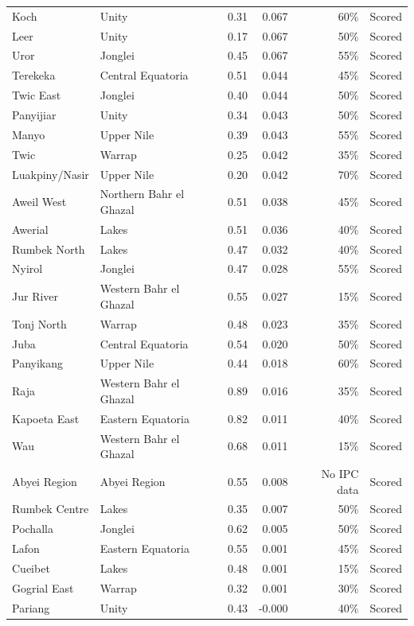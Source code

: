 \begin{longtable}{llrrrl}
Koch & Unity & 0.31 & 0.067 & 60\% & Scored \\
Leer & Unity & 0.17 & 0.067 & 50\% & Scored \\
Uror & Jonglei & 0.45 & 0.067 & 55\% & Scored \\
Terekeka & Central Equatoria & 0.51 & 0.044 & 45\% & Scored \\
Twic East & Jonglei & 0.40 & 0.044 & 50\% & Scored \\
Panyijiar & Unity & 0.34 & 0.043 & 50\% & Scored \\
Manyo & Upper Nile & 0.39 & 0.043 & 55\% & Scored \\
Twic & Warrap & 0.25 & 0.042 & 35\% & Scored \\
Luakpiny/Nasir & Upper Nile & 0.20 & 0.042 & 70\% & Scored \\
Aweil West & Northern Bahr el Ghazal & 0.51 & 0.038 & 45\% & Scored \\
Awerial & Lakes & 0.51 & 0.036 & 40\% & Scored \\
Rumbek North & Lakes & 0.47 & 0.032 & 40\% & Scored \\
Nyirol & Jonglei & 0.47 & 0.028 & 55\% & Scored \\
Jur River & Western Bahr el Ghazal & 0.55 & 0.027 & 15\% & Scored \\
Tonj North & Warrap & 0.48 & 0.023 & 35\% & Scored \\
Juba & Central Equatoria & 0.54 & 0.020 & 50\% & Scored \\
Panyikang & Upper Nile & 0.44 & 0.018 & 60\% & Scored \\
Raja & Western Bahr el Ghazal & 0.89 & 0.016 & 35\% & Scored \\
Kapoeta East & Eastern Equatoria & 0.82 & 0.011 & 40\% & Scored \\
Wau & Western Bahr el Ghazal & 0.68 & 0.011 & 15\% & Scored \\
Abyei Region & Abyei Region & 0.55 & 0.008 & No IPC data & Scored \\
Rumbek Centre & Lakes & 0.35 & 0.007 & 50\% & Scored \\
Pochalla & Jonglei & 0.62 & 0.005 & 50\% & Scored \\
Lafon & Eastern Equatoria & 0.55 & 0.001 & 45\% & Scored \\
Cueibet & Lakes & 0.48 & 0.001 & 15\% & Scored \\
Gogrial East & Warrap & 0.32 & 0.001 & 30\% & Scored \\
Pariang & Unity & 0.43 & -0.000 & 40\% & Scored \\

\end{longtable}
